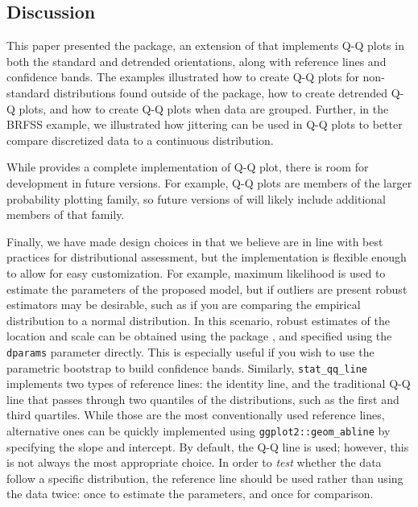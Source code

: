 \subsection{Discussion}\label{discussion}

This paper presented the  package, an extension of
 that implements Q-Q plots in both the standard and
detrended orientations, along with reference lines and confidence bands.
The examples illustrated how to create Q-Q plots for non-standard
distributions found outside of the  package, how to create
detrended Q-Q plots, and how to create Q-Q plots when data are grouped.
Further, in the BRFSS example, we illustrated how jittering can be used
in Q-Q plots to better compare discretized data to a continuous
distribution.

While  provides a complete implementation of Q-Q plot,
there is room for development in future versions. For example, Q-Q plots
are members of the larger probability plotting family, so future
versions of  will likely include additional members of that
family.

Finally, we have made design choices in  that we believe
are in line with best practices for distributional assessment, but the
implementation is flexible enough to allow for easy customization. For
example, maximum likelihood is used to estimate the parameters of the
proposed model, but if outliers are present robust estimators may be
desirable, such as if you are comparing the empirical distribution to a
normal distribution. In this scenario, robust estimates of the location
and scale can be obtained using the  package
\citep{robustbase}, and specified using the \texttt{dparams} parameter
directly. This is especially useful if you wish to use the parametric
bootstrap to build confidence bands. Similarly, \texttt{stat\_qq\_line}
implements two types of reference lines: the identity line, and the
traditional Q-Q line that passes through two quantiles of the
distributions, such as the first and third quartiles. While those are
the most conventionally used reference lines, alternative ones can be
quickly implemented using \texttt{ggplot2::geom\_abline} by specifying
the slope and intercept. By default, the Q-Q line is used; however, this
is not always the most appropriate choice. In order to \emph{test}
whether the data follow a specific distribution, the reference line
should be used rather than using the data twice: once to estimate the
parameters, and once for comparison.

